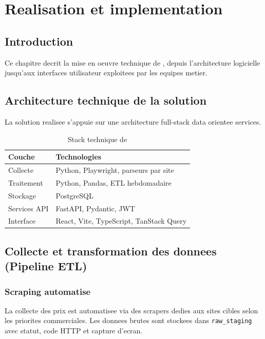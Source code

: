 \chapter{Realisation et implementation}

\section{Introduction}
Ce chapitre decrit la mise en oeuvre technique de \ProjectName, depuis l'architecture logicielle jusqu'aux interfaces utilisateur exploitees par les equipes metier.

\section{Architecture technique de la solution}
La solution realisee s'appuie sur une architecture full-stack data orientee services.

\begin{table}[H]
\centering
\caption{Stack technique de \ProjectName}
\begin{tabular}{p{3.8cm}p{9.2cm}}
\toprule
\textbf{Couche} & \textbf{Technologies} \\
\midrule
Collecte & Python, Playwright, parseurs par site \\
Traitement & Python, Pandas, ETL hebdomadaire \\
Stockage & PostgreSQL \\
Services API & FastAPI, Pydantic, JWT \\
Interface & React, Vite, TypeScript, TanStack Query \\
\bottomrule
\end{tabular}
\end{table}


\section{Collecte et transformation des donnees (Pipeline ETL)}
\subsection{Scraping automatise}
La collecte des prix est automatisee via des scrapers dedies aux sites cibles selon les priorites commerciales. Les donnees brutes sont stockees dans \texttt{raw\_staging} avec statut, code HTTP et capture d'ecran.

